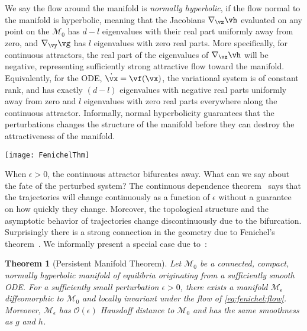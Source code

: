 \documentclass{article} %
\newcounter{ct}
\newcommand{\manifold}{\mathcal{M}}
\newtheorem{theorem}{Theorem}
\theoremstyle{definition}
\theoremstyle{remark}
\renewcommand{\cite}{\citep}
\begin{document}
We say the flow around the manifold is \emph{normally hyperbolic}, if the flow normal to the manifold is hyperbolic, meaning that the Jacobians $\nabla_\vz \vh$ evaluated on any point on the $\manifold_0$ has $d-l$ eigenvalues with their real part uniformly away from zero, and $\nabla_\vy \vg$ has $l$ eigenvalues with zero real parts.
More specifically, for continuous attractors, the real part of the eigenvalues of $\nabla_\vz \vh$ will be negative, representing sufficiently strong attractive flow toward the manifold.
Equivalently, for the ODE, $\dot{\vx} = \vf(\vx)$, the variational system is of constant rank, and has exactly $(d-l)$ eigenvalues with negative real parts uniformly away from zero and $l$ eigenvalues with zero real parts everywhere along the continuous attractor.
Informally, normal hyperbolicity guarantees that the perturbations changes the structure of the manifold before they can destroy the attractiveness of the manifold.

\begin{SCfigure}[10][bthp]
  \centering
  \texttt{[image: FenichelThm]}
  \caption{
    Persistent manifold theorem applied to compact continuous attractor guarantees the flow on the slow manifold $\manifold_\epsilon$ is locally invariant and continues to be attractive.
    The dashed line is a trajectory ``trapped'' in the slow manifold (locally invariant). %
  }
  \label{fig:fenichel}
\end{SCfigure}

When $\epsilon > 0$, the continuous attractor bifurcates away.
What can we say about the fate of the perturbed system?
The continuous dependence theorem~\citep{Chicone2006} says that the trajectories will change continuously as a function of $\epsilon$ without a guarantee on how quickly they change.
Moreover, the topological structure and the asymptotic behavior of trajectories change discontinuously due to the bifurcation.
Surprisingly there is a strong connection in the geometry due to Fenichel's theorem~\cite{fenichel1971}.
We informally present a special case due to~\citet{Jones1995}:
\begin{theorem}[Persistent Manifold Theorem]
Let $\manifold_0$ be a connected, compact, normally hyperbolic manifold of equilibria originating from a sufficiently smooth ODE.
For a sufficiently small perturbation $\epsilon > 0$, there exists a manifold $\manifold_\epsilon$ diffeomorphic to $\manifold_0$ and locally invariant under the flow of \eqref{eq:fenichel:flow}.
Moreover, $\manifold_\epsilon$ has $\mathcal{O}(\epsilon)$ Hausdoff distance to $\manifold_0$ and has the same smoothness as $g$ and $h$. %
\end{theorem}
\end{document}
